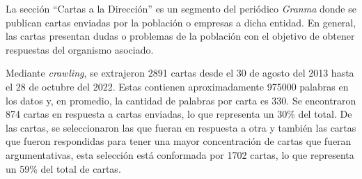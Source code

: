 \documentclass[a4paper,11pt,twocolumn,twoside]{article}
\begin{document}
La sección ``Cartas a la Dirección'' \cite{gallego2013cartas} es un segmento del periódico \textit{Granma} donde se publican
cartas enviadas por la población o empresas a dicha entidad. En general, las cartas 
presentan dudas o problemas de la población con el objetivo de obtener respuestas del organismo
asociado. 

Mediante \textit{crawling}, se extrajeron 2891 cartas desde el 30 de agosto del 2013 hasta el 28 de octubre del 2022. Estas 
contienen aproximadamente 975000 palabras en los datos y, en promedio, la cantidad de palabras por carta es 330.
Se encontraron 874 cartas en respuesta a cartas enviadas, lo que representa un 30\% del total. 
De las cartas, se seleccionaron las que fueran en respuesta a otra y también las 
cartas que fueron respondidas para tener una mayor concentración de cartas que fueran argumentativas, 
esta selección está conformada por 1702 cartas, lo que representa un 59\% del total de cartas.



\end{document}
